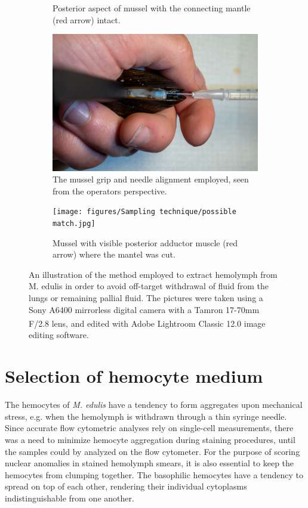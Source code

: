 \begin{figure}[t]
\begin{subfigure}[b]{.45\textwidth}
        \caption{Posterior aspect of mussel with the connecting mantle (red arrow) intact.}
        \label{sfig:b}
    \end{subfigure}
    \newline
    \begin{subfigure}[b]{.45\textwidth}
        \centering
        \includegraphics[width=\textwidth]{figures/Sampling technique/hands colors centered.jpg}
        \caption{The mussel grip and needle alignment employed, seen from the operators perspective. }
        \label{sfig:c}
    \end{subfigure}
    \hfill
    \begin{subfigure}[b]{.45\textwidth}
        \centering
        \texttt{[image: figures/Sampling technique/possible match.jpg]}
        \caption{Mussel with visible posterior adductor muscle (red arrow) where the mantel was cut.}
        \label{sfig:d}
    \end{subfigure}
    \caption{An illustration of the method employed to extract hemolymph from M. edulis in order to avoid off-target withdrawal of fluid from the lungs or remaining pallial fluid. The pictures were taken using a Sony A6400 mirrorless digital camera with a Tamron 17-70mm F/2.8 lens, and edited with Adobe\textsuperscript{\textregistered} Lightroom Classic 12.0 image editing software.}
    \label{fig:Hemolymph_sampling_illustration}
\end{figure}

\section{Selection of hemocyte medium}
The hemocytes of \emph{M. edulis} have a tendency to form aggregates upon mechanical stress, e.g. when the hemolymph is withdrawn through a thin syringe needle. Since accurate flow cytometric analyses rely on single-cell measurements, there was a need to minimize hemocyte aggregation during staining procedures, until the samples could by analyzed on the flow cytometer. For the purpose of scoring nuclear anomalies in stained hemolymph smears, it is also essential to keep the hemocytes from clumping together. The basophilic hemocytes have a tendency to spread on top of each other, rendering their individual cytoplasms indistinguishable from one another.

